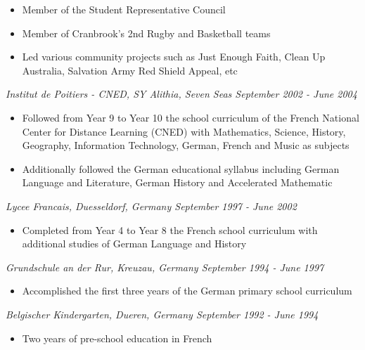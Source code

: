 \documentclass[margin]{res}
\begin{document}
\begin{resume}
\begin{itemize}
  \item Member of the Student Representative Council
  \item Member of Cranbrook’s 2nd Rugby and Basketball teams
  \item Led various community projects such as Just Enough Faith, Clean Up Australia, Salvation Army Red Shield Appeal, etc
  \end{itemize}
  {\it Institut de Poitiers - CNED, SY Alithia, Seven Seas \hfill September 2002 - June 2004}
  \begin{itemize} \itemsep -0.5pt 
  \item Followed from Year 9 to Year 10 the school curriculum of the French National Center for Distance Learning (CNED) with Mathematics, Science, History, Geography, Information Technology, German, French and Music as subjects
  \item Additionally followed the German educational syllabus including German Language and Literature, German History and Accelerated Mathematic
  \end{itemize}
  {\it Lycee Francais, Duesseldorf, Germany \hfill September 1997 - June 2002}
  \begin{itemize} \itemsep -0.5pt 
  \item Completed from Year 4 to Year 8 the French school curriculum with additional studies of German Language and History
  \end{itemize}
  {\it Grundschule an der Rur, Kreuzau, Germany \hfill September 1994 - June 1997}
  \begin{itemize} \itemsep -0.5pt 
  \item Accomplished the first three years of the German primary school curriculum
  \end{itemize}
  {\it Belgischer Kindergarten, Dueren, Germany \hfill September 1992 - June 1994}
  \begin{itemize} \itemsep -0.5pt 
  \item Two years of pre-school education in French
  \end{itemize}

\newpage


\end{resume}
\end{document}
